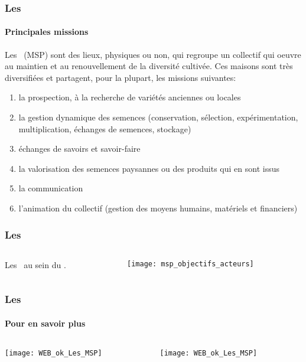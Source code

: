 \begin{frame}
\frametitle{Les \MSPs}
\framesubtitle{Principales missions}

Les \MSPs~(MSP) sont des lieux, physiques ou non, qui regroupe un collectif qui oeuvre au maintien et au renouvellement de la diversité cultivée.
Ces maisons sont très diversifiées et partagent, pour la plupart, les missions suivantes:

\begin{enumerate}[<+->]
\item la prospection, à la recherche de variétés anciennes ou locales
\item la  gestion dynamique des semences (conservation, sélection, expérimentation, multiplication, échanges de semences, stockage)
\item échanges de savoirs et savoir-faire
\item la valorisation des semences paysannes ou des produits qui en sont issus
\item la communication
\item l'animation du collectif (gestion des moyens humains, matériels et financiers)
\end{enumerate}

\end{frame}



\begin{frame}
\frametitle{Les \MSPs}

\begin{columns}

\begin{column}{.5\textwidth}
Les \MSPs~au sein du \RSP.

\end{column}

\begin{column}{.5\textwidth}
\texttt{[image: msp\_objectifs\_acteurs]} \tiny \cite{msp_objectifs_acteurs}
\end{column}

\end{columns}

\end{frame}


\begin{frame}
\frametitle{Les \MSPs}
\framesubtitle{Pour en savoir plus}

\begin{columns}

\begin{column}{.5\textwidth}
\texttt{[image: WEB\_ok\_Les\_MSP]} \tiny \cite{WEB_ok_Les_MSP}
\end{column}

\begin{column}{.5\textwidth}
\texttt{[image: WEB\_ok\_Les\_MSP]} \tiny \cite{WEB_ok_Les_MSP}
\end{column}

\end{columns}

\end{frame}


